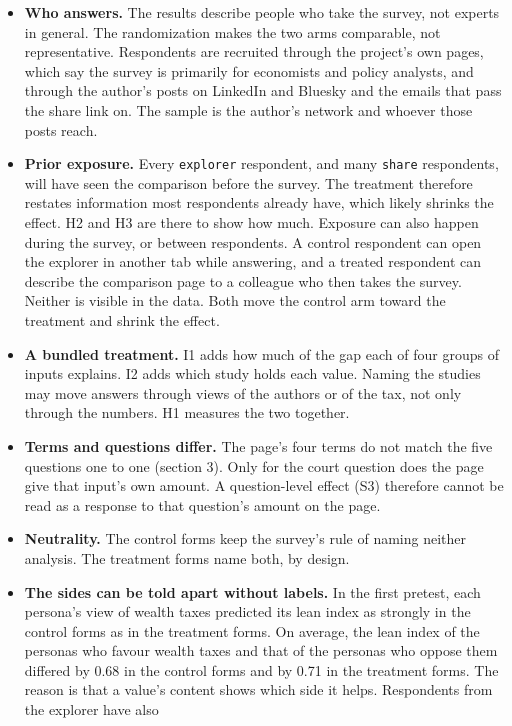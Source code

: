 \begin{itemize}
\tightlist
\item
  \textbf{Who answers.} The results describe people who take the survey, not experts in general. The
  randomization makes the two arms comparable, not representative. Respondents are recruited
  through the project's own pages, which say the survey is primarily for economists and policy
  analysts, and through the author's posts on LinkedIn and Bluesky and the emails that pass the
  share link on. The sample is the author's network and whoever those posts reach.
\item
  \textbf{Prior exposure.} Every \texttt{explorer} respondent, and many \texttt{share} respondents, will have seen
  the comparison before the survey. The treatment therefore restates information most respondents
  already have, which likely shrinks the effect. H2 and H3 are there to show how much. Exposure can
  also happen during the survey, or between respondents. A control respondent can open the
  explorer in another tab while answering, and a treated respondent can describe the comparison
  page to a colleague who then takes the survey. Neither is visible in the data. Both move the
  control arm toward the treatment and shrink the effect.
\item
  \textbf{A bundled treatment.} I1 adds how much of the gap each of four groups of inputs explains. I2
  adds which study holds each value. Naming the studies may move answers through views of the authors or of the tax, not only
  through the numbers. H1 measures the two together.
\item
  \textbf{Terms and questions differ.} The page's four terms do not match the five questions one to one
  (section 3). Only for the court question does the page give that input's own amount. A
  question-level effect (S3) therefore cannot be read as a response to that question's amount on
  the page.
\item
  \textbf{Neutrality.} The control forms keep the survey's rule of naming neither analysis. The treatment
  forms name both, by design.
\item
  \textbf{The sides can be told apart without labels.} In the first pretest, each persona's view of
  wealth taxes predicted its lean index as strongly in the control forms as in the treatment forms.
  On average, the lean index of the personas who favour wealth taxes and that of the personas who
  oppose them differed by 0.68 in the control forms and by 0.71 in the treatment forms. The reason
  is that a value's content shows which side it helps. Respondents from the explorer have also

\end{itemize}
